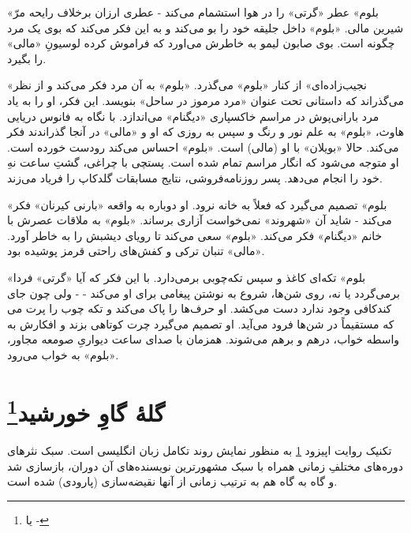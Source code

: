 \documentclass[12pt]{book}
\newcommand{\noun}[1]{«{#1}»}
\begin{document}
    \noun{بلوم} عطر \noun{گرتی} را در هوا استشمام می‌کند - عطری ارزان برخلاف رایحه مرّ شیرین مالی. \noun{بلوم} داخل جلیقه خود را بو می‌کند و به این فکر می‌کند که بوی یک مرد چگونه است. بوی صابون لیمو به خاطرش می‌اورد که فراموش کرده لوسیونِ \noun{مالی} را بگیرد.

    «نجیب‌زاده‌ای» از کنار \noun{بلوم} می‌گذرد. \noun{بلوم} به آن مرد فکر می‌کند و از نظر می‌گذراند که داستانی تحت عنوان «مرد مرموز در ساحل» بنویسد. این فکر، او را به یاد مرد بارانی‌پوش در مراسم خاکسپاری \noun{دیگنام} می‌اندازد. با نگاه به فانوس دریایی هاوث، \noun{بلوم} به علم نور و رنگ و سپس به روزی که او و \noun{مالی} در آنجا گذراندند فکر می‌کند. حالا \noun{بویلان} با او (مالی) است. \noun{بلوم} احساس می‌کند رودست خورده است. او متوجه می‌شود که انگار مراسم تمام شده است. پستچی با چراغی، گشتِ ساعت نهِ خود را انجام می‌دهد. پسر روزنامه‌فروشی، نتایج مسابقات گلدکاپ را فریاد می‌زند.

    \noun{بلوم} تصمیم می‌گیرد که فعلاً به خانه نرود. او دوباره به واقعه \noun{بارنی کیرنان} فکر می‌کند - شاید آن \noun{شهروند‬} نمی‌خواست آزاری برساند. \noun{بلوم} به ملاقات عصرش با خانم \noun{دیگنام} فکر می‌کند. \noun{بلوم} سعی می‌کند تا رویای دیشبش را به خاطر آورد. \noun{مالی} تنبان ترکی و کفش‌های راحتی قرمز پوشیده بود.

    \noun{بلوم} تکه‌ای کاغذ و سپس تکه‌چوبی برمی‌دارد. با این فکر که آیا \noun{گرتی} فردا برمی‌گردد یا نه، روی شن‌ها، شروع به نوشتن پیغامی برای او می‌کند -  - ولی چون جای کافی وجود ندارد دست می‌کشد. او حرف‌ها را پاک می‌کند و تکه چوب را پرت می‎‌کند که مستقیماً در شن‌ها فرود می‌آید. او تصمیم می‌گیرد چرت کوتاهی بزند و افکارش به واسطه خواب، درهم و برهم می‌شوند. همزمان با صدای ساعت دیواریِ صومعه مجاور، \noun{بلوم} به خواب می‌رود.

    \chapter[گلۀ گاوِ خورشید]{گلۀ گاوِ خورشید\protect\footnote{ یا -}}\label{ep:14}
    تکنیک روایت اپیزود \ref{ep:14} به منظور نمایش روند تکامل زبان انگلیسی است. سبک نثر‌های دوره‌های مختلفِ زمانی همراه با سبک مشهورترین نویسنده‌های آن دوران، بازسازی شد و گاه به گاه هم به ترتیب زمانی از آنها نقیضه‌سازی (پارودی) شده است.
\end{document}
